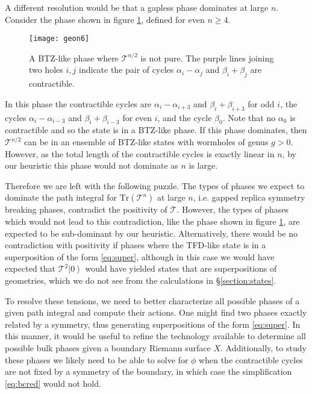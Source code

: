\documentclass[letterpaper,12pt]{article}
\newcommand{\Tr}{\text{Tr}}
\newcommand{\ket}[1]{\left| #1\right>}
\begin{document}
A different resolution would be that a gapless phase dominates at large $n$. Consider the phase shown in figure \ref{fig:6block}, defined for even $n\geq 4$.
\begin{figure}[ht!]
	\centering
	\texttt{[image: geon6]}
	\caption{A BTZ-like phase where $\mathcal T^{n/2}$ is not pure. The purple lines joining two holes $i,j$ indicate the pair of cycles $\alpha_i -\alpha_j$ and $\beta_i+\beta_j$ are contractible. \label{fig:6block}}
\end{figure}
In this phase the contractible cycles are $\alpha_i - \alpha_{i+3}$ and $\beta_i + \beta_{i+3}$ for odd $i$, the cycles $\alpha_i -\alpha_{i-3}$ and $\beta_i + \beta_{i-3}$ for even $i$, and the cycle $\beta_0$. Note that no $\alpha_0$ is contractible and so the state is in a BTZ-like phase. If this phase dominates, then $\mathcal T^{n/2}$ can be in an ensemble of BTZ-like states with wormholes of genus $g>0$. However, as the total length of the contractible cycles is exactly linear in $n$, by our heuristic this phase would not dominate as $n$ is large.

 Therefore we are left with the following puzzle. The types of phases we expect to dominate the path integral for $\Tr(\mathcal T^n)$ at large $n$, i.e. gapped replica symmetry breaking phases, contradict the positivity of $\mathcal T$. However, the types of phases which would not lead to this contradiction, like the phase shown in figure \ref{fig:6block}, are expected to be sub-dominant by our heuristic. Alternatively, there would be no contradiction with positivity if phases where the TFD-like state is in a superposition of the form \eqref{eq:super}, although in this case we would have expected that $\mathcal T^2\ket 0$ would have yielded states that are superpositions of geometries, which we do not see from the calculations in \S\ref{section:states}.

 To resolve these tensions, we need to better characterize all possible phases of a given path integral and compute their actions. One might find two phases exactly related by a symmetry, thus generating superpositions of the form \eqref{eq:super}. In this manner, it would be useful to refine the technology available to determine all possible bulk phases given a boundary Riemann surface $X$. Additionally, to study these phases we likely need to be able to solve for $\phi$ when the contractible cycles are not fixed by a symmetry of the boundary, in which case the simplification \eqref{eq:bcred} would not hold.
\end{document}
